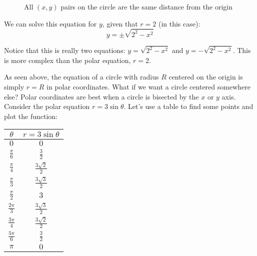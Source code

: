 \begin{figure}[htbp]
\centering
    \caption{All $(x,y)$ pairs on the circle are the same distance from the origin}
    \label{fig:circle2}
    \end{figure}
    
We can solve this equation for $y$, given that $r = 2$ (in this case):
$$y = \pm \sqrt{2^2 - x^2}$$

Notice that this is really two equations: $y = \sqrt{2^2 - x^2}$ and $y = -\sqrt{
2^2 - x^2}$. This is more complex than the polar equation, $r = 2$. 

As seen above, the equation of a circle with radius $R$ centered on the origin 
is simply $r = R$ in polar coordinates. What if we want a circle centered 
somewhere else? Polar coordinates are best when a circle is bisected by the 
$x$ or $y$ axis. Consider the polar equation $r = 3 \sin{\theta}$. Let's use a 
table to find some points and plot the function:

\begin{center}
\begin{tabular}{|c|c|}\hline
$\theta$ & $r = 3 \sin{\theta}$\\\hline
$0$ & $0$\\\hline
$\frac{\pi}{6}$ & $\frac{3}{2}$\\\hline
$\frac{\pi}{4}$ & $\frac{3\sqrt{2}}{2}$\\\hline
$\frac{\pi}{3}$ & $\frac{3\sqrt{3}}{2}$\\\hline
$\frac{\pi}{2}$ & $3$\\\hline
$\frac{2\pi}{3}$ & $\frac{3\sqrt{3}}{2}$\\\hline
$\frac{3\pi}{4}$ & $\frac{3\sqrt{2}}{2}$\\\hline
$\frac{5\pi}{6}$ & $\frac{3}{2}$\\\hline
$\pi$ & $0$\\\hline
\end{tabular}
\end{center}


